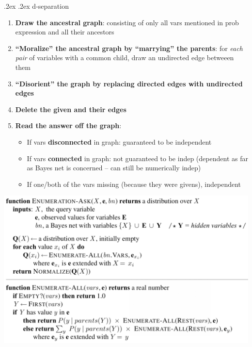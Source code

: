 \documentclass[11pt,landscape,a4paper]{article}
\makeatletter
\renewcommand{\subsection}{\@startsection{subsection}{1}{0mm}%
  {.2ex}%
  {.2ex}%
{\sffamily\bfseries}}
\makeatother
\begin{document}
\begin{multicols*}{4}
  \subsection{d-separation}
  \begin{enumerate}
    \item \textbf{Draw the ancestral graph}: consisting of only all vars mentioned in prob expression and all their ancestors
    \item \textbf{``Moralize'' the ancestral graph by ``marrying'' the parents}: for \emph{each pair} of variables with a common child, draw an undirected edge betweeen them
    \item \textbf{``Disorient'' the graph by replacing directed edges with undirected edges}
    \item \textbf{Delete the given and their edges}
    \item \textbf{Read the answer off the graph}:
          \begin{itemize}
            \item If vars \textbf{disconnected} in graph: guaranteed to be independent
            \item If vars \textbf{connected} in graph: not guaranteed to be indep (dependent as far as Bayes net is concerned -- can still be numerically indep)
            \item If one/both of the vars missing (because they were givens), independent
          \end{itemize}
  \end{enumerate}

  \includegraphics[width=\columnwidth]{enumeration}



\end{multicols*}
\end{document}
